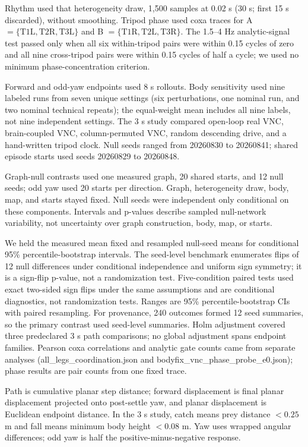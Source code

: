 \documentclass[conference]{IEEEtran}
\begin{document}
Rhythm used that heterogeneity draw, 1,500 samples at 0.02 s (30 s; first 15 s discarded), without smoothing. Tripod phase used coxa traces for A $=\{\mathrm{T1L,T2R,T3L}\}$ and B $=\{\mathrm{T1R,T2L,T3R}\}$. The 1.5--4 Hz analytic-signal test passed only when all six within-tripod pairs were within 0.15 cycles of zero and all nine cross-tripod pairs were within 0.15 cycles of half a cycle; we used no minimum phase-concentration criterion.

Forward and odd-yaw endpoints used 8 s rollouts. Body sensitivity used nine labeled runs from seven unique settings (six perturbations, one nominal run, and two nominal technical repeats); the equal-weight mean includes all nine labels, not nine independent settings. The 3 s study compared open-loop real VNC, brain-coupled VNC, column-permuted VNC, random descending drive, and a hand-written tripod clock. Null seeds ranged from 20260830 to 20260841; shared episode starts used seeds 20260829 to 20260848.

Graph-null contrasts used one measured graph, 20 shared starts, and 12 null seeds; odd yaw used 20 starts per direction. Graph, heterogeneity draw, body, map, and starts stayed fixed. Null seeds were independent only conditional on these components. Intervals and p-values describe sampled null-network variability, not uncertainty over graph construction, body, map, or starts.

We held the measured mean fixed and resampled null-seed means for conditional 95\% percentile-bootstrap intervals. The seed-level benchmark enumerates flips of 12 null differences under conditional independence and uniform sign symmetry; it is a sign-flip p-value, not a randomization test. Five-condition paired tests used exact two-sided sign flips under the same assumptions and are conditional diagnostics, not randomization tests. Ranges are 95\% percentile-bootstrap CIs with paired resampling. For provenance, 240 outcomes formed 12 seed summaries, so the primary contrast used seed-level summaries. Holm adjustment covered three predeclared 3 s path comparisons; no global adjustment spans endpoint families. Pearson coxa correlations and analytic gate counts came from separate analyses (all\_legs\_coordination.json and bodyfix\_vnc\_phase\_probe\_e0.json); phase results are pair counts from one fixed trace.

Path is cumulative planar step distance; forward displacement is final planar displacement projected onto post-settle yaw, and planar displacement is Euclidean endpoint distance. In the 3 s study, catch means prey distance $<0.25$ m and fall means minimum body height $<0.08$ m. Yaw uses wrapped angular differences; odd yaw is half the positive-minus-negative response.
\end{document}
